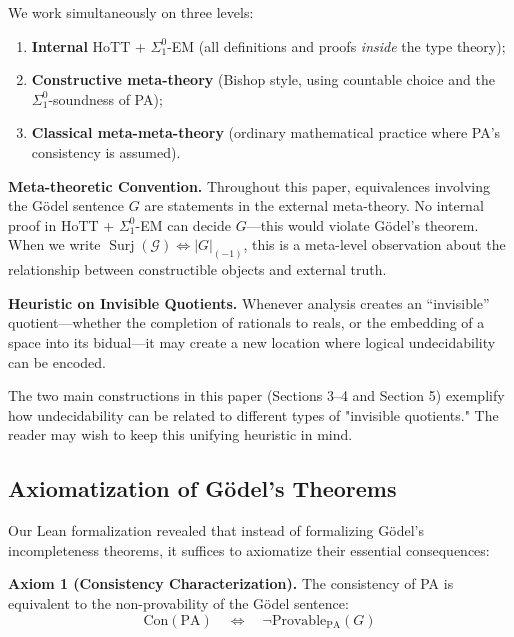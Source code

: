 \documentclass[11pt]{article}
\theoremstyle{definition}
\newcommand{\SigOne}{\Sigma^{0}_{\!1}}
\DeclareMathOperator{\Surj}{Surj}
\newcommand{\trunc}[1]{\lvert #1\rvert_{(-1)}}
\begin{document}
We work simultaneously on three levels:
\begin{enumerate}[label=(\Alph*)]
  \item \textbf{Internal} HoTT + $\SigOne$-EM (all definitions and proofs \emph{inside} the type theory);
  \item \textbf{Constructive meta-theory} (Bishop style, using countable choice and the $\SigOne$-soundness of PA);
  \item \textbf{Classical meta-meta-theory} (ordinary mathematical practice where PA's consistency is assumed).
\end{enumerate}

\begin{mdframed}[roundcorner=4pt]
\textbf{Meta-theoretic Convention.} Throughout this paper, equivalences involving the Gödel sentence $G$ are statements in the external meta-theory. No internal proof in HoTT + $\SigOne$-EM can decide $G$---this would violate Gödel's theorem. When we write $\Surj(\mathcal{G}) \iff \trunc{G}$, this is a meta-level observation about the relationship between constructible objects and external truth.
\end{mdframed}

\begin{mdframed}[roundcorner=4pt]
\textbf{Heuristic on Invisible Quotients.} Whenever analysis creates an ``invisible'' quotient---whether the completion of rationals to reals, or the embedding of a space into its bidual---it may create a new location where logical undecidability can be encoded.
\end{mdframed}

The two main constructions in this paper (Sections 3–4 and Section 5) exemplify how undecidability can be related to different types of "invisible quotients." The reader may wish to keep this unifying heuristic in mind.

\subsection{Axiomatization of Gödel's Theorems}

Our Lean formalization revealed that instead of formalizing Gödel's incompleteness theorems, it suffices to axiomatize their essential consequences:

\begin{mdframed}[roundcorner=4pt]
\textbf{Axiom 1 (Consistency Characterization).} 
The consistency of PA is equivalent to the non-provability of the Gödel sentence:
\[
\text{Con}(\text{PA}) \quad\Longleftrightarrow\quad \neg\text{Provable}_{\text{PA}}(G)
\]
\end{mdframed}
\end{document}
